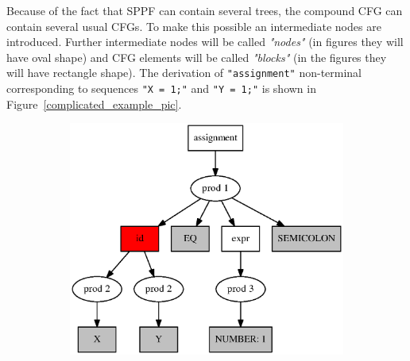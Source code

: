 \documentclass{sig-alternate-05-2015}
\begin{document}
Because of the fact that SPPF can contain several trees, the compound CFG can contain several usual CFGs. To make this possible an intermediate nodes are introduced. Further intermediate nodes will be called \textit{"nodes"} (in figures they will have oval shape) and CFG elements will be called \textit{"blocks"} (in the figures they will have rectangle shape). The derivation of \verb|"assignment"| non-terminal corresponding to sequences \verb|"X = 1;"| and \verb|"Y = 1;"| is shown in Figure~\ref{complicated_example_pic}. 

\begin{figure}[h!]
    \begin{center}
    \begin{subfigure}{0.3\textwidth}    
        \includegraphics[scale=0.3]{Graphs/cfg_idea_complicated.eps}    
    \caption{}
    \label{complicated_a}
    \end{subfigure}
    \begin{subfigure}{0.1\textwidth}      

\end{subfigure}
\end{center}
\end{figure}
\end{document}
